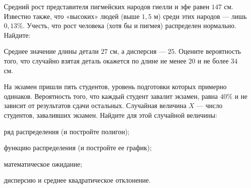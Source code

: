 \vfil

\begin{zkrPlain}{25}\noindent 
	Средний рост представителя пигмейских народов гиелли и эфе равен $147$ см. Известно также, что «высоких» людей (выше $1{,}5$ м) среди этих народов — лишь $0{,}13\%$. Учесть, что рост человека (хотя бы и пигмея) распределен нормально. Найдите: \par {}
 
\end{zkrPlain}

\vfil

\begin{zkrPlain}{25}\noindent 
	Среднее значение длины детали $ 27 $ см, а дисперсия --- $ 25 $. Оцените вероятность того, что случайно взятая деталь окажется по длине не менее $ 20 $ и не более $ 34 $ см.
 
\end{zkrPlain}

\newpage\setcounter{zad}{0}\setcounter{footnote}{0}



\begin{zkrPlain}{25}\noindent 
	На экзамен пришли пять студентов, уровень подготовки которых примерно одинаков. Вероятность того, что каждый студент завалит экзамен, равна $40\%$ и не зависит от результатов сдачи остальных. Случайная величина $X$ --- число студентов, заваливших экзамен.  Найдите для этой случайной величины: \par \smallskip\small{ \par \zz ряд распределения (и постройте полигон); \par \zz функцию распределения (и постройте ее график); \par \zz математическое ожидание; \par \zz дисперсию и среднее квадратическое отклонение.\par \par}
 
\end{zkrPlain}

\vfil

